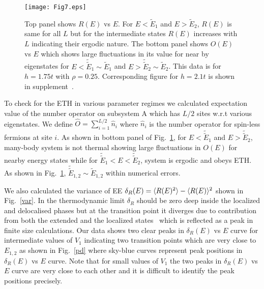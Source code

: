 \documentclass[prl,aps,twocolumn,floats,nofootinbib,showpacs]{revtex4}
\begin{document}
\begin{figure}[h!]
\begin{center}
\texttt{[image: Fig7.eps]}
\caption{Top panel shows $R(E)$ vs $E$. For $E< \tilde{E}_1$ and $E > \tilde{E}_2$, $R(E)$ is same for all $L$ but for the intermediate states $R(E)$ increases with $L$ indicating their ergodic nature. 
The bottom panel shows $O(E)$ vs $E$ which shows large fluctuations in its value for near by eigenstates for $E<\tilde{\tilde{E}}_1\sim \tilde{E}_1$ and $E>\tilde{\tilde{E}}_2\sim \tilde{E}_2$. This data is for $h=1.75t$ with $\rho=0.25$. Corresponding figure for $h=2.1t$ is shown in supplement~\cite{supplemental}.}
\label{Renyi1}
\vskip-1.8cm
\end{center}
\end{figure}

To check for the ETH in various parameter regimes we calculated expectation value of the number operator on subsystem A which has $L/2$ sites w.r.t various eigenstates. We define $\hat{O} = \sum_{i=1}^{L/2} \hat{n}_i$ where $\hat{n}_i$ is the number operator for spin-less fermions at site $i$. As shown in bottom panel of Fig.~\ref{Renyi1}, for $E < \tilde{\tilde{E}}_1$ and $E > \tilde{\tilde{E}}_2$, many-body system is not thermal showing large fluctuations in $O(E)$ for nearby energy states  while for $\tilde{\tilde{E}}_1 < E< \tilde{\tilde{E}}_2$, system is ergodic and obeys ETH. As shown in Fig.~\ref{Renyi1}, $\tilde{\tilde{E}}_{1,2} \sim \tilde{E}_{1,2}$ within numerical errors.

We also calculated the variance of EE $\delta_R(E)=\langle R(E)^2\rangle-\langle R(E) \rangle^2$ shown in Fig.~\ref{var}. In the thermodynamic limit $\delta_R$ should be zero deep inside the localized and delocalised phases but at the transition point it diverges due to contribution from both the extended and the localized states~\cite{Bardarson2014} which is reflected as a peak in finite size calculations. Our data shows two clear peaks in $\delta_R(E)$ vs $E$ curve for intermediate values of $V_1$ indicating two transition points which are very close to $E_{1,2}$ as shown in Fig.~\ref{pd} where sky-blue curves represent peak positions in $\delta_R(E)$ vs $E$ curve. Note that for small values of $V_1$ the two peaks in $\delta_R(E)$ vs $E$ curve are very close to each other and it is difficult to identify the peak positions precisely. 
\end{document}
